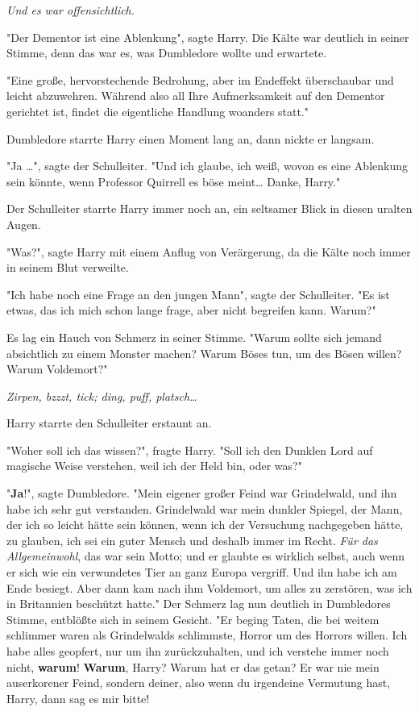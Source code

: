 {\emph{Und es war offensichtlich.}

"Der Dementor ist eine Ablenkung", sagte Harry. Die Kälte war deutlich in seiner Stimme, denn das war es, was Dumbledore wollte und erwartete.

"Eine große, hervorstechende Bedrohung, aber im Endeffekt überschaubar und leicht abzuwehren. Während also all Ihre Aufmerksamkeit auf den Dementor gerichtet ist, findet die eigentliche Handlung woanders statt."

Dumbledore starrte Harry einen Moment lang an, dann nickte er langsam.

"Ja …", sagte der Schulleiter. "Und ich glaube, ich weiß, wovon es eine Ablenkung sein könnte, wenn Professor Quirrell es böse meint… Danke, Harry."

Der Schulleiter starrte Harry immer noch an, ein seltsamer Blick in diesen uralten Augen.

"Was?", sagte Harry mit einem Anflug von Verärgerung, da die Kälte noch immer in seinem Blut verweilte.

"Ich habe noch eine Frage an den jungen Mann", sagte der Schulleiter. "Es ist etwas, das ich mich schon lange frage, aber nicht begreifen kann. Warum?"

Es lag ein Hauch von Schmerz in seiner Stimme. "Warum sollte sich jemand absichtlich zu einem Monster machen? Warum Böses tun, um des Bösen willen? Warum Voldemort?"

\emph{Zirpen, bzzzt, tick; ding, puff, platsch…}

Harry starrte den Schulleiter erstaunt an.

"Woher soll ich das wissen?", fragte Harry. "Soll ich den Dunklen Lord auf magische Weise verstehen, weil ich der Held bin, oder was?"

"\textbf{Ja}!", sagte Dumbledore. "Mein eigener großer Feind war Grindelwald, und ihn habe ich sehr gut verstanden. Grindelwald war mein dunkler Spiegel, der Mann, der ich so leicht hätte sein können, wenn ich der Versuchung nachgegeben hätte, zu glauben, ich sei ein guter Mensch und deshalb immer im Recht. \emph{Für das Allgemeinwohl}, das war sein Motto; und er glaubte es wirklich selbst, auch wenn er sich wie ein verwundetes Tier an ganz Europa vergriff. Und ihn habe ich am Ende besiegt. Aber dann kam nach ihm Voldemort, um alles zu zerstören, was ich in Britannien beschützt hatte." Der Schmerz lag nun deutlich in Dumbledores Stimme, entblößte sich in seinem Gesicht. "Er beging Taten, die bei weitem schlimmer waren als Grindelwalds schlimmste, Horror um des Horrors willen. Ich habe alles geopfert, nur um ihn zurückzuhalten, und ich verstehe immer noch nicht, \textbf{warum}! \textbf{Warum}, Harry? Warum hat er das getan? Er war nie mein auserkorener Feind, sondern deiner, also wenn du irgendeine Vermutung hast, Harry, dann sag es mir bitte!

}
